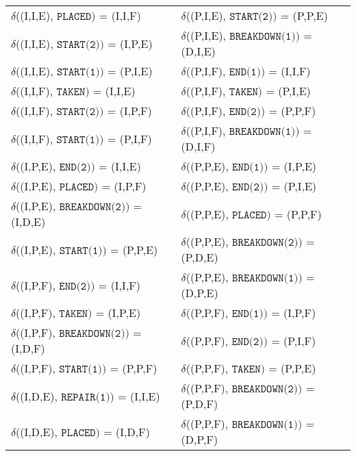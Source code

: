 \begin{table}[H]\centering
  \begin{tabular}{l|l}
    $\delta$((I,I,E), $\texttt{PLACED})$ = (I,I,F)       & $\delta$((P,I,E), $\texttt{START(2)})$ = (P,P,E)     \\
    $\delta$((I,I,E), $\texttt{START(2)})$ = (I,P,E)     & $\delta$((P,I,E), $\texttt{BREAKDOWN(1)})$ = (D,I,E) \\
    $\delta$((I,I,E), $\texttt{START(1)})$ = (P,I,E)     & $\delta$((P,I,F), $\texttt{END(1)})$ = (I,I,F)       \\
    $\delta$((I,I,F), $\texttt{TAKEN})$ = (I,I,E)        & $\delta$((P,I,F), $\texttt{TAKEN})$ = (P,I,E)        \\
    $\delta$((I,I,F), $\texttt{START(2)})$ = (I,P,F)     & $\delta$((P,I,F), $\texttt{END(2)})$ = (P,P,F)       \\
    $\delta$((I,I,F), $\texttt{START(1)})$ = (P,I,F)     & $\delta$((P,I,F), $\texttt{BREAKDOWN(1)})$ = (D,I,F) \\
    $\delta$((I,P,E), $\texttt{END(2)})$ = (I,I,E)       & $\delta$((P,P,E), $\texttt{END(1)})$ = (I,P,E)       \\
    $\delta$((I,P,E), $\texttt{PLACED})$ = (I,P,F)       & $\delta$((P,P,E), $\texttt{END(2)})$ = (P,I,E)       \\
    $\delta$((I,P,E), $\texttt{BREAKDOWN(2)})$ = (I,D,E) & $\delta$((P,P,E), $\texttt{PLACED})$ = (P,P,F)       \\
    $\delta$((I,P,E), $\texttt{START(1)})$ = (P,P,E)     & $\delta$((P,P,E), $\texttt{BREAKDOWN(2)})$ = (P,D,E) \\
    $\delta$((I,P,F), $\texttt{END(2)})$ = (I,I,F)       & $\delta$((P,P,E), $\texttt{BREAKDOWN(1)})$ = (D,P,E) \\
    $\delta$((I,P,F), $\texttt{TAKEN})$ = (I,P,E)        & $\delta$((P,P,F), $\texttt{END(1)})$ = (I,P,F)       \\
    $\delta$((I,P,F), $\texttt{BREAKDOWN(2)})$ = (I,D,F) & $\delta$((P,P,F), $\texttt{END(2)})$ = (P,I,F)       \\
    $\delta$((I,P,F), $\texttt{START(1)})$ = (P,P,F)     & $\delta$((P,P,F), $\texttt{TAKEN})$ = (P,P,E)        \\
    $\delta$((I,D,E), $\texttt{REPAIR(1)})$ = (I,I,E)    & $\delta$((P,P,F), $\texttt{BREAKDOWN(2)})$ = (P,D,F) \\
    $\delta$((I,D,E), $\texttt{PLACED})$ = (I,D,F)       & $\delta$((P,P,F), $\texttt{BREAKDOWN(1)})$ = (D,P,F) \\

\end{tabular}
\end{table}
